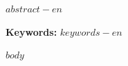 \documentclass[12pt,a4paper,oneside]{book}
\begin{document}
\begin{singlespace}
\noindent\textit{$abstract-en$}

\vspace{0.3cm}
\noindent\textbf{Keywords:} \textit{$keywords-en$}
\end{singlespace}

\newpage
\renewcommand{\contentsname}{DAFTAR ISI}
\tableofcontents

\newpage
\renewcommand{\listfigurename}{DAFTAR GAMBAR}
\listoffigures
\newpage
\renewcommand{\listtablename}{DAFTAR TABEL}
\listoftables

\mainmatter
\pagestyle{plain}

$body$
\end{document}
